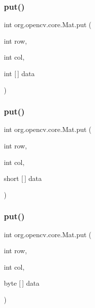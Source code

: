 \subsubsection{\texorpdfstring{put()}{put()}\hspace{0.1cm}{\footnotesize\ttfamily [3/5]}}
{\footnotesize\ttfamily int org.\+opencv.\+core.\+Mat.\+put (\begin{DoxyParamCaption}\item[{int}]{row,  }\item[{int}]{col,  }\item[{int \mbox{[}$\,$\mbox{]}}]{data }\end{DoxyParamCaption})}

\mbox{\label{classorg_1_1opencv_1_1core_1_1_mat_a4d1c54091897d06ce22114cc74299796}} 
\subsubsection{\texorpdfstring{put()}{put()}\hspace{0.1cm}{\footnotesize\ttfamily [4/5]}}
{\footnotesize\ttfamily int org.\+opencv.\+core.\+Mat.\+put (\begin{DoxyParamCaption}\item[{int}]{row,  }\item[{int}]{col,  }\item[{short \mbox{[}$\,$\mbox{]}}]{data }\end{DoxyParamCaption})}

\mbox{\label{classorg_1_1opencv_1_1core_1_1_mat_a4d0c8b7bef73cdbe148d51a2a3ed5e05}} 
\subsubsection{\texorpdfstring{put()}{put()}\hspace{0.1cm}{\footnotesize\ttfamily [5/5]}}
{\footnotesize\ttfamily int org.\+opencv.\+core.\+Mat.\+put (\begin{DoxyParamCaption}\item[{int}]{row,  }\item[{int}]{col,  }\item[{byte \mbox{[}$\,$\mbox{]}}]{data }\end{DoxyParamCaption})}

